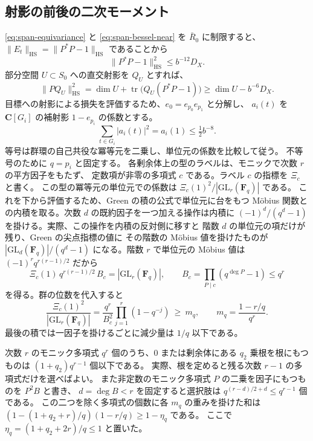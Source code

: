 \subsection{射影の前後の二次モーメント}

\eqref{eq:span-equivariance} と \eqref{eq:span-bessel-near} を
\(\bar R_0\) に制限すると、\(\|E_t\|_{\mathrm{HS}}=\|P^*P-1\|_{\mathrm{HS}}\)
であることから
\begin{equation}\label{eq:span-gram-isometry}
 \|P^*P-1\|_{\mathrm{HS}}^2\leq b^{-12}D_X.
\end{equation}
部分空間 \(U\subset S_0\) への直交射影を \(Q_U\) とすれば、
\[
 \|P Q_U\|_{\mathrm{HS}}^2
 = \dim U+\operatorname{tr}\bigl(Q_U(P^*P-1)\bigr)
 \geq \dim U-b^{-6}D_X.
\]
目標への射影による損失を評価するため、\(e_0=e_{p_0}e_{p_1}\) と分解し、
\(a_i(t)\) を \(\mathbf C[G_i]\) の補射影 \(1-e_{p_i}\) の係数とする。
\[
 \sum_{t\in G_i}|a_i(t)|^2=a_i(1)\leq \tfrac12 b^{-8}.
\]
等号は群環の自己共役な冪等元を二乗し、単位元の係数を比較して従う。
不等号のために \(q=p_i\) と固定する。
各剰余体上の型のラベルは、モニックで次数 \(r\) の平方因子をもたず、
定数項が非零の多項式 \(c\) である。ラベル \(c\) の指標を \(\Xi_c\) と書く。
この型の冪等元の単位元での係数は \(\Xi_c(1)^2/|\mathrm{GL}_r(\mathbf F_q)|\) である。
これを下から評価するため、Green の積の公式で単位元に台をもつ
Möbius 関数との内積を取る。次数 \(d\) の既約因子を一つ加える操作は内積に
\((-1)^d/(q^d-1)\) を掛ける。実際、この操作を内積の反対側に移すと
階数 \(d\) の単位元の項だけが残り、Green の尖点指標の値に
その階数の Möbius 値を掛けたものが \(|\mathrm{GL}_d(\mathbf F_q)|/(q^d-1)\)
になる。階数 \(r\) で単位元の Möbius 値は \((-1)^r q^{r(r-1)/2}\) だから
\[
 \Xi_c(1)\,q^{r(r-1)/2}\,B_c=|\mathrm{GL}_r(\mathbf F_q)|,\qquad
 B_c=\prod_{P\mid c}(q^{\deg P}-1)\le q^r
\]
を得る。群の位数を代入すると
\[
 \frac{\Xi_c(1)^2}{|\mathrm{GL}_r(\mathbf F_q)|}
   =\frac{q^r}{B_c^2}\prod_{j=1}^r(1-q^{-j})
   \ \ge\ m_q,\qquad m_q=\frac{1-r/q}{q^r}.
\]
最後の積では一因子を掛けるごとに減少量は \(1/q\) 以下である。

次数 \(r\) のモニック多項式 \(q^r\) 個のうち、\(0\) または剰余体にある
\(q_2\) 乗根を根にもつものは \((1+q_2)q^{r-1}\) 個以下である。
実際、根を定めると残る次数 \(r-1\) の多項式だけを選べばよい。
また非定数のモニック多項式 \(P\) の二乗を因子にもつものを \(P^2B\) と書き、
\(d=\deg B<r\) を固定すると選択肢は
\(q^{(r-d)/2+d}\le q^{r-1}\) 個である。
この二つを除く多項式の個数に各 \(m_q\) の重みを掛けた和は
\((1-(1+q_2+r)/q)(1-r/q)\ge1-\eta_q\) である。
ここで \(\eta_q=(1+q_2+2r)/q\le1\) と置いた。

